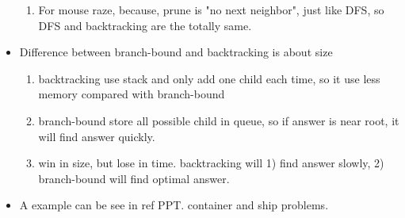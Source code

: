 \documentclass[a4paper,12pt,twoside]{book}
\begin{document}
\begin{itemize}
\begin{enumerate}
\item For mouse raze, because, prune is "no next neighbor", just like DFS, so DFS and backtracking are the totally same.
\end{enumerate}

\item Difference between branch-bound  and backtracking is about size
\begin{enumerate}
\item backtracking use stack and only add one child each time, so it use less memory compared with branch-bound
\item branch-bound store all possible child in queue, so if answer is near root, it will find answer quickly. 

\item win in size, but lose in time. backtracking will 1) find answer slowly, 2) branch-bound will find optimal answer. 
\end{enumerate}

\item A example can be see in ref PPT.  container and ship problems. 

\end{itemize}


\ifx \allfiles \undefined
\end{document}

